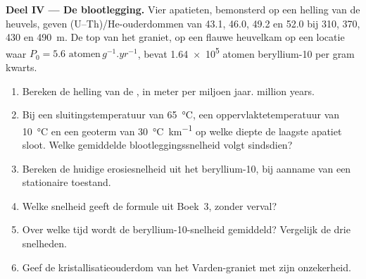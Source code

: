\begin{problem}
\medskip\noindent\textbf{Deel IV --- De blootlegging.} Vier apatieten, bemonsterd op
een helling van de heuvels, geven (U--Th)/He-ouderdommen van 43.1, 46.0, 49.2 en
\qty{52.0}{\Ma} bij 310, 370, 430 en \qty{490}{m}. De top van het graniet,
op een flauwe heuvelkam op een locatie waar $P_0 = \num{5.6}\text{ atomen}\,\unit{g^{-1}.yr^{-1}}$,
bevat \num{1.64e5} atomen beryllium-10 per gram kwarts.
\begin{enumerate}[resume]
\item Bereken de helling van de , in meter per miljoen jaar.
million years.
\item Bij een sluitingstemperatuur van \qty{65}{\celsius}, een oppervlaktetemperatuur van
\qty{10}{\celsius} en een geoterm van \qty{30}{\celsius.km^{-1}} op welke diepte
de laagste apatiet sloot. Welke gemiddelde blootleggingssnelheid volgt sindsdien?
\item Bereken de huidige erosiesnelheid uit het beryllium-10, bij aanname van een
stationaire toestand.
\item Welke snelheid geeft de formule uit Boek~3, zonder verval?
\item Over welke tijd wordt de beryllium-10-snelheid gemiddeld? Vergelijk de
drie snelheden.
\item Geef de kristallisatieouderdom van het Varden-graniet met zijn
onzekerheid.
\end{enumerate}
\end{problem}

